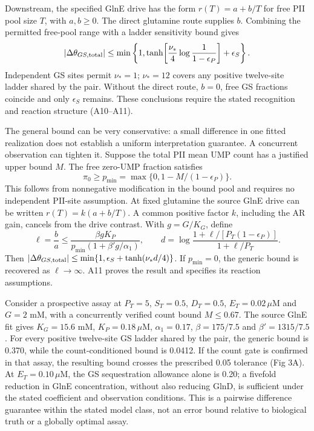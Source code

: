 \documentclass[10pt,letterpaper]{article}
\begin{document}
Downstream, the specified GlnE drive has the form $r(T)=a+b/T$ for free PII pool size $T$, with $a,b\geq0$. The direct glutamine route supplies $b$. Combining the permitted free-pool range with a ladder sensitivity bound gives
\[
 |\Delta\theta_{GS,\rm total}|\leq
 \min\left\{1,\tanh\!\left[\frac{\nu_*}{4}\log\frac{1}{1-\epsilon_P}\right]+\epsilon_S\right\}.
\]
Independent GS sites permit $\nu_*=1$; $\nu_*=12$ covers any positive twelve-site ladder shared by the pair. Without the direct route, $b=0$, free GS fractions coincide and only $\epsilon_S$ remains. These conclusions require the stated recognition and reaction structure (A10--A11).

The general bound can be very conservative: a small difference in one fitted realization does not establish a uniform interpretation guarantee. A concurrent observation can tighten it. Suppose the total PII mean UMP count has a justified upper bound $M$. The free zero-UMP fraction satisfies
\[
 \pi_0\geq p_{\min}=\max\{0,1-M/(1-\epsilon_P)\}.
\]
This follows from nonnegative modification in the bound pool and requires no independent PII-site assumption. At fixed glutamine the source GlnE drive can be written $r(T)=k(a+b/T)$. A common positive factor $k$, including the AR gain, cancels from the drive contrast. With $g=G/K_G$, define
\[
 \ell=\frac{b}{a}\leq\frac{\beta gK_P}{p_{\min}(1+\beta'g/\alpha_1)},\qquad
 d=\log\frac{1+\ell/[P_T(1-\epsilon_P)]}{1+\ell/P_T}.
\]
Then $|\Delta\theta_{GS,\rm total}|\leq\min\{1,\epsilon_S+\tanh(\nu_*d/4)\}$. If $p_{\min}=0$, the generic bound is recovered as $\ell\to\infty$. A11 proves the result and specifies its reaction assumptions.

Consider a prospective assay at $P_T=5$, $S_T=0.5$, $D_T=0.5$, $E_T=0.02\,\mu$M and $G=2$ mM, with a concurrently verified count bound $M\leq0.67$. The source GlnE fit gives $K_G=15.6$ mM, $K_P=0.18\,\mu$M, $\alpha_1=0.17$, $\beta=175/7.5$ and $\beta'=1315/7.5$ \cite{r71}. For every positive twelve-site GS ladder shared by the pair, the generic bound is 0.370, while the count-conditioned bound is 0.0412. If the count gate is confirmed in that assay, the resulting bound crosses the prescribed 0.05 tolerance (Fig 3A). At $E_T=0.10\,\mu$M, the GS sequestration allowance alone is 0.20; a fivefold reduction in GlnE concentration, without also reducing GlnD, is sufficient under the stated coefficient and observation conditions. This is a pairwise difference guarantee within the stated model class, not an error bound relative to biological truth or a globally optimal assay.
\end{document}
